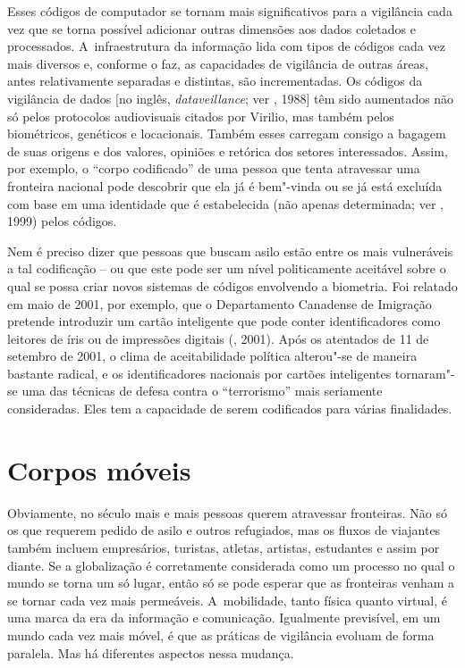 Esses códigos de computador se tornam mais significativos para a
vigilância cada vez que se torna possível adicionar outras dimensões aos
dados coletados e processados. A~infraestrutura da informação lida com
tipos de códigos cada vez mais diversos e, conforme o faz, as
capacidades de vigilância de outras áreas, antes relativamente separadas
e distintas, são incrementadas. Os códigos da vigilância de dados {[}no
inglês, \emph{dataveillance}; ver , 1988{]} têm sido aumentados
não só pelos protocolos audiovisuais citados por Virilio, mas também
pelos biométricos, genéticos e locacionais. Também esses carregam
consigo a bagagem de suas origens e dos valores, opiniões e retórica dos
setores interessados. Assim, por exemplo, o ``corpo codificado'' de uma
pessoa que tenta atravessar uma fronteira nacional pode descobrir que
ela já é bem"-vinda ou se já está excluída com base em uma identidade que
é estabelecida (não apenas determinada; ver , 1999) pelos
códigos.

Nem é preciso dizer que pessoas que buscam asilo estão entre os mais
vulneráveis a tal codificação -- ou que este pode ser um nível
politicamente aceitável sobre o qual se possa criar novos sistemas de
códigos envolvendo a biometria. Foi relatado em maio de 2001, por
exemplo, que o Departamento Canadense de Imigração pretende introduzir
um cartão inteligente que pode conter identificadores como leitores de
íris ou de impressões digitais (, 2001). Após os atentados de 11
de setembro de 2001, o clima de aceitabilidade política alterou"-se de
maneira bastante radical, e os identificadores nacionais por cartões
inteligentes tornaram"-se uma das técnicas de defesa contra o
``terrorismo'' mais seriamente consideradas. Eles tem a capacidade de
serem codificados para várias finalidades.

\section{Corpos móveis}

Obviamente, no século  mais e mais pessoas querem atravessar
fronteiras. Não só os que requerem pedido de asilo e outros refugiados,
mas os fluxos de viajantes também incluem empresários, turistas,
atletas, artistas, estudantes e assim por diante. Se a globalização é
corretamente considerada como um processo no qual o mundo se torna um só
lugar, então só se pode esperar que as fronteiras venham a se tornar
cada vez mais permeáveis. A~mobilidade, tanto física quanto virtual, é
uma marca da era da informação e comunicação. Igualmente previsível, em
um mundo cada vez mais móvel, é que as práticas de vigilância evoluam de
forma paralela. Mas há diferentes aspectos nessa mudança.

